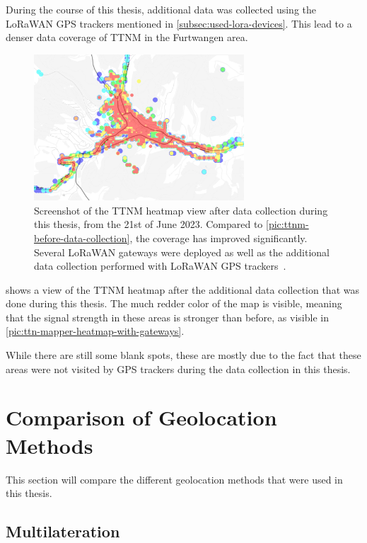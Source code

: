During the course of this thesis, additional data was collected using the \ac{LoRaWAN} \ac{GPS} trackers mentioned in \cref{subsec:used-lora-devices}.
This lead to a denser data coverage of \acl{TTNM} in the Furtwangen area.

\begin{figure}[htbp]
    \centering
    \includegraphics[width=0.7\textwidth]{pictures/ttn-mapper/ttnm_heatmap_after_data_collection.jpg}
    \caption{
        Screenshot of the \ac{TTNM} heatmap view after data collection during this thesis, from the 21st of June 2023.
        Compared to \cref{pic:ttnm-before-data-collection}, the coverage has improved significantly.
        Several \ac{LoRaWAN} gateways were deployed as well as the additional data collection performed with \ac{LoRaWAN} \ac{GPS} trackers~\cite{ttn_mapper_ttn_2023}.
    }\label{pic:ttnm-heatmap-after-data-collection}
\end{figure}

 shows a view of the \ac{TTNM} heatmap after the additional data collection that was done during this thesis.
The much redder color of the map is visible, meaning that the signal strength in these areas is stronger than before, as visible in \cref{pic:ttn-mapper-heatmap-with-gateways}.

While there are still some blank spots, these are mostly due to the fact that these areas were not visited by \ac{GPS} trackers during the data collection in this thesis.

\section{Comparison of Geolocation Methods}

This section will compare the different geolocation methods that were used in this thesis.

\subsection{Multilateration}\label{subsec:conclusion-multilateration}

